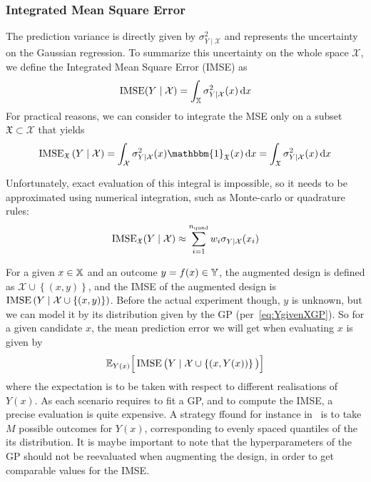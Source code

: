 \documentclass[../../Main_ManuscritThese.tex]{subfiles}
\begin{document}
\subsubsection{Integrated Mean Square Error}
\cite{sacks_designs_1989}
The prediction variance is directly given by $\sigma^2_{Y\mid \mathcal{X}}$ and represents the uncertainty on the Gaussian regression. To summarize this uncertainty on the whole space $\mathcal{X}$, we define the Integrated Mean Square Error (IMSE) as
\begin{equation}
  \operatorname{\mathrm{IMSE}}(Y \mid \mathcal{X}) = \int_{\mathbb{X}} \sigma_{Y\mid\mathcal{X}}^2(x)\,\mathrm{d}x
\end{equation}
For practical reasons, we can consider to integrate the MSE only on a subset $\mathfrak{X}\subset \mathcal{X}$ that yields
\begin{equation}
  \IMSE_{\mathfrak{X}}\left(Y \mid \mathcal{X} \right) = \int_{\mathcal{X}} \sigma^2_{Y\mid \mathcal{X}}(x)  \mathbbm{1}_{\mathfrak{X}}(x)\,\mathrm{d}x = \int_{\mathfrak{X}} \sigma^2_{Y\mid \mathcal{X}}(x)\,\mathrm{d}x
\end{equation}

Unfortunately, exact evaluation of this integral is impossible, so it needs to be approximated using numerical integration, such as Monte-carlo or quadrature rules:
\begin{equation}
  \operatorname{\mathrm{IMSE}}_{\mathfrak{X}}(Y\mid \mathcal{X}) \approx \sum_{i=1}^{n_{\mathrm{quad}}} w_i \sigma_{Y\mid\mathcal{X}}(x_i)
\end{equation}

For a given $x\in \mathbb{X}$ and an outcome $y=f(x)\in\mathbb{Y}$, the augmented design is defined as $\mathcal{X} \cup \left\{(x, y)\right\}$, and the IMSE of the augmented design is $\operatorname{\mathrm{IMSE}}\left(Y \mid \mathcal{X} \cup \left\{(x, y)\right\} \right)$.
Before the actual experiment though, $y$ is unknown, but we can model it by its distribution given by the GP (per~\cref{eq:YgivenXGP}). So for a given candidate $x$, the mean prediction error we will get when evaluating $x$ is given by
\begin{equation}
  \label{eq:IMSE_augmented}
  \mathbb{E}_{Y(x)}\Big[\operatorname{\mathrm{IMSE}}\big(Y \mid \mathcal{X} \cup \left\{(x, Y(x))\right\} \big)\Big]
\end{equation}
where the expectation is to be taken with respect to different realisations of $Y(x)$. As each scenario requires to fit a GP, and to compute the IMSE, a precise evaluation is quite expensive. A strategy ffound for instance in~\cite{villemonteix_informational_2006} is to take $M$ possible outcomes for $Y(x)$, corresponding to evenly spaced quantiles of the its distribution.
It is maybe important to note that the hyperparameters of the GP should not be reevaluated when augmenting the design, in order to get comparable values for the IMSE.
\end{document}
